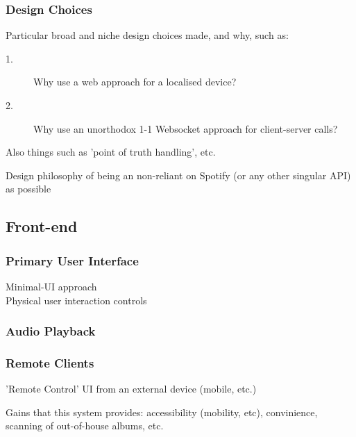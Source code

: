           \subsubsection{Design Choices}
              Particular broad and niche design choices made, and why, such as:
              \begin{description}
                  \item[1.] Why use a web approach for a localised device?
                  \item[2.] Why use an unorthodox 1-1 Websocket approach for client-server calls?
              \end{description}
              Also things such as 'point of truth handling', etc.
  
              Design philosophy of being an non-reliant on Spotify (or any other singular API) as possible
  
      \subsection{Front-end}
          \subsubsection{Primary User Interface}
  
              Minimal-UI approach \\
              Physical user interaction controls
  
          \subsubsection{Audio Playback}
  
          \subsubsection{Remote Clients}
              'Remote Control' UI from an external device (mobile, etc.)
  
              Gains that this system provides: accessibility (mobility, etc), convinience, scanning of out-of-house albums, etc.
      
